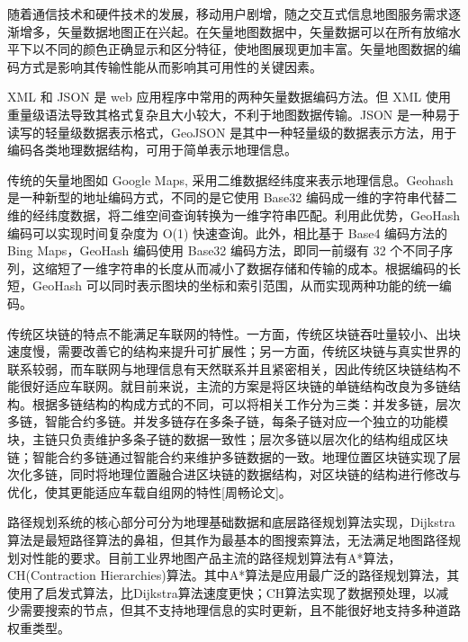 随着通信技术和硬件技术的发展，移动用户剧增，随之交互式信息地图服务需求逐渐增多，矢量数据地图正在兴起。在矢量地图数据中，矢量数据可以在所有放缩水平下以不同的颜色正确显示和区分特征，使地图展现更加丰富。矢量地图数据的编码方式是影响其传输性能从而影响其可用性的关键因素。\par
XML 和 JSON 是 web 应用程序中常用的两种矢量数据编码方法。但 XML 使用重量级语法导致其格式复杂且大小较大，不利于地图数据传输。JSON 是一种易于读写的轻量级数据表示格式，GeoJSON 是其中一种轻量级的数据表示方法，用于编码各类地理数据结构，可用于简单表示地理信息。\par
传统的矢量地图如 Google Maps, 采用二维数据经纬度来表示地理信息。Geohash 是一种新型的地址编码方式，不同的是它使用 Base32 编码成一维的字符串代替二维的经纬度数据，将二维空间查询转换为一维字符串匹配。利用此优势，GeoHash 编码可以实现时间复杂度为 O(1) 快速查询。此外，相比基于 Base4 编码方法的 Bing Maps，GeoHash 编码使用 Base32 编码方法，即同一前缀有 32 个不同子序列，这缩短了一维字符串的长度从而减小了数据存储和传输的成本。根据编码的长短，GeoHash 可以同时表示图块的坐标和索引范围，从而实现两种功能的统一编码。\par

传统区块链的特点不能满足车联网的特性。一方面，传统区块链吞吐量较小、出块速度慢，需要改善它的结构来提升可扩展性；另一方面，传统区块链与真实世界的联系较弱，而车联网与地理信息有天然联系并且紧密相关，因此传统区块链结构不能很好适应车联网。就目前来说，主流的方案是将区块链的单链结构改良为多链结构。根据多链结构的构成方式的不同，可以将相关工作分为三类：并发多链，层次多链，智能合约多链。并发多链存在多条子链，每条子链对应一个独立的功能模块，主链只负责维护多条子链的数据一致性；层次多链以层次化的结构组成区块链；智能合约多链通过智能合约来维护多链数据的一致。地理位置区块链实现了层次化多链，同时将地理位置融合进区块链的数据结构，对区块链的结构进行修改与优化，使其更能适应车载自组网的特性[周畅论文]。\par

路径规划系统的核心部分可分为地理基础数据和底层路径规划算法实现，Dijkstra算法是最短路径算法的鼻祖，但其作为最基本的图搜索算法，无法满足地图路径规划对性能的要求。目前工业界地图产品主流的路径规划算法有A*算法，CH(Contraction Hierarchies)算法。其中A*算法是应用最广泛的路径规划算法，其使用了启发式算法，比Dijkstra算法速度更快；CH算法实现了数据预处理，以减少需要搜索的节点，但其不支持地理信息的实时更新，且不能很好地支持多种道路权重类型。

